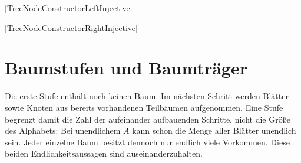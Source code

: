 \documentclass[main.tex]{subfiles}
\begin{document}
\begin{tabproofsplitwide}
    [TreeNodeConstructorLeftInjective]
    \BXXVIIProofTreeNodeConstructorCancellation
  \closeproofpartwideindR

    [TreeNodeConstructorRightInjective]
    \BXXVIIProofTreeNodeConstructorCancellation
  \closeproofpartwideindR
\end{tabproofsplitwide}

\section{Baumstufen und Baumträger}

Die erste Stufe enthält noch keinen Baum. Im nächsten Schritt werden
Blätter sowie Knoten aus bereits vorhandenen Teilbäumen aufgenommen.
Eine Stufe begrenzt damit die Zahl der aufeinander aufbauenden Schritte,
nicht die Größe des Alphabets: Bei unendlichem \(A\) kann schon die
Menge aller Blätter unendlich sein. Jeder einzelne Baum besitzt dennoch
nur endlich viele Vorkommen. Diese beiden Endlichkeitsaussagen sind
auseinanderzuhalten.

\end{document}
